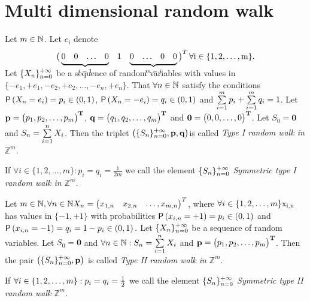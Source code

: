 \chapter{Multi dimensional random walk}
\renewcommand{\rw}{$\left( \{S_n\}_{n=0}^\pinf, \textbf{p}, \textbf{q} \right)$}
\begin{defn}\label{defn-type_I}
  Let $m \in \mathbb{N}$. Let $e_i$ denote \[\left(
  \begin{array}{@{\,}ccccccccc@{\,}}
  \undermat{i-1\vphantom{m-1}}{0 & 0 & \ldots&0 } & 1& \undermat{m-i}{0 & \ldots &0 &0 }\\
  \end{array}
  \right)^T\rm
  \forall i \in \{1, 2, \ldots, m\}.\] Let $\{X_n\}_{n=0}^{+\infty}$ be a sequence of \iid random variables with values in $\{ -e_1, +e_1, -e_2, +e_2, \ldots, -e_n, +e_n\}$.
  That $\forall n \in \mathbb{N}$ satisfy the conditions $\operatorname{\textsf{P}}\left(X_n=e_i \right)=p_i \in \left(0,1\right)$, $\operatorname{\textsf{P}}\left(X_n=-e_i \right)=q_i \in \left(0,1\right)$ and $\suma[i][1][m] p_i+\suma[i][1][m]q_i=1$.
  Let $\bf{p}=\begin{pmatrix}
   p_1, p_2, \ldots, p_m
 \end{pmatrix}^T$, $\bf{q}=\begin{pmatrix}
   q_1, q_2, \ldots, q_m
 \end{pmatrix}^T$ and $\bf{0}=\begin{pmatrix}
    0, 0, \ldots, 0
  \end{pmatrix}^T$. Let $S_0=\textbf{0}$ and $S_n=\suma X_i$. Then the \ce triplet \rw is called \emph{Type I random walk in $\mathbb{Z}^m$}.

  If $\forall i \in \{1, 2, \ldots, m\}: p_i=q_i=\frac{1}{2m}$ we call the \ce element $\{S_n\}_{n=0}^{+\infty}$ \emph{Symmetric type I random walk in $\mathbb{Z}^m$}.
\end{defn}
\begin{defn}\label{defn-type_II}
  Let $m \in \mathbb{N}, \forall n \in \mathbb{N} X_n=\begin{pmatrix}x_{1,n} & x_{2,n}& \ldots, x_{m,n}\end{pmatrix}^T$, where $\forall i \in \{ 1,2, \ldots, m\} \rm x_{i,n}$
  has values in $\{-1,+1\}$ with probabilities $\operatorname{\textsf{P}} \left(x_{i,n}=+1\right)=p_i \in \left(0,1\right)$ and $\operatorname{\textsf{P}} \left(x_{i,n}=-1\right)=q_i=1-p_i \in  \left(0,1 \right).$
  Let $\{X_n\}_{n=0}^{+\infty}$ be a sequence of \iid random variables. Let $S_0=\textbf{0}$ and $\forall n \in \N: S_n=\suma X_i$ and $\bf{p}=\begin{pmatrix}
   p_1, p_2, \ldots, p_m
 \end{pmatrix}^T$. Then the pair $\left(\{S_n\}_{n=0}^{+\infty}, \textbf{p} \right)$ is called \emph{Type II random walk in $\mathbb{Z}^m$}.

  If $\forall i \in \{1, 2, \ldots, m\}: p_i=q_i=\frac{1}{2}$ we call the \ce element $\{S_n\}_{n=0}^{+\infty}$ \emph{Symmetric type II random walk $\mathbb{Z}^m$}.
\end{defn}
